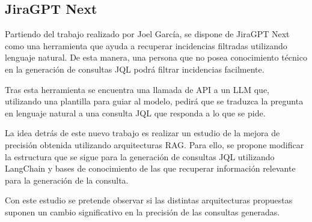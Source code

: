 \subsection{JiraGPT Next}
Partiendo del trabajo realizado por Joel García, se dispone de JiraGPT Next como una herramienta que ayuda a recuperar incidencias filtradas utilizando lenguaje natural. De esta manera, una persona que no posea conocimiento técnico en la generación de consultas JQL podrá filtrar incidencias facilmente.

Tras esta herramienta se encuentra una llamada de API a un LLM que, utilizando una plantilla para guiar al modelo, pedirá que se traduzca la pregunta en lenguaje natural a una consulta JQL que responda a lo que se pide.

La idea detrás de este nuevo trabajo es realizar un estudio de la mejora de precisión obtenida utilizando arquitecturas RAG. Para ello, se propone modificar la estructura que se sigue para la generación de consultas JQL utilizando LangChain y bases de conocimiento de las que recuperar información relevante para la generación de la consulta.

Con este estudio se pretende observar si las distintas arquitecturas propuestas suponen un cambio significativo en la precisión de las consultas generadas.